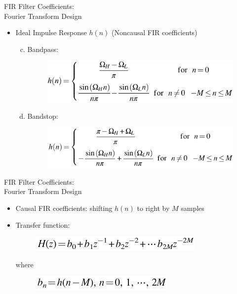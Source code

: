 \documentclass[pdflatex,compress,mathserif]{beamer}
\begin{document}
\begin{frame}{FIR Filter Coefficients:\\Fourier Transform Design}
    \begin{itemize}
        \item Ideal Impulse Response $h(n)$ (Noncausal FIR coefficients)
        \begin{enumerate}[a.]
            \setcounter{enumi}{2}
            \item Bandpass:
            \begin{figure}
                \centering
                \includegraphics[width=0.8\linewidth]{./img/img06.png}
            \end{figure}
            \item Bandstop:
            \begin{figure}
                \centering
                \includegraphics[width=0.8\linewidth]{./img/img07.png}
            \end{figure}
        \end{enumerate}
    \end{itemize}    
\end{frame}

\begin{frame}{FIR Filter Coefficients:\\Fourier Transform Design}
    \begin{itemize}
        \item Causal FIR coefficients: shifting $h(n)$ to right by $M$ samples
        \item Transfer function:
        \begin{figure}
            \centering
            \includegraphics[width=0.6\linewidth]{./img/img08.png}
        \end{figure}
        where
        \begin{figure}
            \centering
            \includegraphics[width=0.5\linewidth]{./img/img09.png}
        \end{figure}
    \end{itemize}    
\end{frame}
\end{document}
